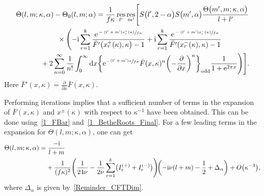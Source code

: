 \documentclass[pdftex]{sigma}
\numberwithin{equation}{section}
\DeclareMathOperator{\res}{res}
\begin{document}
\begin{gather}\label{2_Theta_Int}
\Theta(l, m; \kappa, \alpha)-\Theta_0(l, m; \alpha)=\frac{1}{f\kappa}\res_{l'}\res_{m'}
\Biggl[
S\bigl(l', 2-\alpha\bigr) S\bigl(m', \alpha\bigr) \frac{\Theta\bigl(m', m; \kappa, \alpha\bigr)}{l+l'}\cr
\qquad{}\times\Biggl(
-{\rm i}\sum_{r=1}^{k} \frac{{\rm e}^{\sfrac{-(l'+m')x_r^+(\kappa)}{f\kappa}}}{\bar{F}'\bigl(x_r^+(\kappa), \kappa\bigr)-1}
+{\rm i}\sum_{r=1}^{k} \frac{{\rm e}^{\sfrac{-(l'+m')x_r^-(\kappa)}{f\kappa}}}{\bar{F}'(x_r^-(\kappa), \kappa)-1} \cr
\hphantom{\times\Biggl(}\qquad{} +2\sum_{n=0}^{\infty}\frac{1}{n!} \int_{0}^{\infty} {\rm d}x
\biggl\{
{\rm e}^{-\sfrac{(l'+m')x}{f\kappa}} \bar{F}(x, \kappa)^n \biggl(-\frac{\partial}{\partial x}\biggr)^n
\biggr\}_{\text{odd}}
\frac{1}{1+{\rm e}^{2\pi x}}
\Biggr)
\Biggr].
\end{gather}
Here $\bar{F}'(x, \kappa)=\frac{\partial}{\partial x}\bar{F}(x, \kappa)$.

Performing iterations implies that a sufficient number of terms in the expansion of $\bar{F}(x, \kappa)$ and $x^{\pm}(\kappa)$ with respect to $\kappa^{-1}$ have been obtained. This can be done using~\eqref{1_FBar} and~\eqref{1_BetheRoots_Final}. For a few leading terms in the expansion for $\Theta(l, m; \kappa, \alpha)$, one can get
\begin{align*}
&\Theta(l, m; \kappa, \alpha)=\frac{-{\rm i}}{l+m}  \\
&\hphantom{\Theta(l, m; \kappa, \alpha)=}{}
+\frac{1}{(f\kappa)^2}\Biggl( \frac{1}{24\nu}-\frac{1}{2\nu}\sum_{r=1}^{k}\bigl(I^{(+)}_r+I^{(-)}_r\bigr)\Biggr)\!\biggl(-{\rm i}\nu(l+m)-\frac{1}{2}+\Delta_\alpha\biggr)+O\bigl(\kappa^{-3}\bigr), \nonumber
\end{align*}
where $\Delta_\alpha$ is given by~\eqref{Reminder_CFTDim}.
\end{document}

